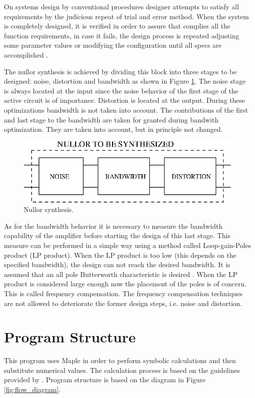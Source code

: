 \documentclass[conference]{IEEEtran}
\begin{document}
On systems design by conventional procedures designer attempts to satisfy all requirements by the judicious repeat of trial and error method. When the system is completely designed, it is verified in order to assure that complies all the function requirements, in case it fails, the design process is repeated adjusting some parameter values or modifying the configuration until all specs are accomplished \cite{ogata}.

The nullor synthesis is achieved by dividing this block into three stages to be designed:  noise, distortion and bandwidth as shown in Figure \ref{fig:block}. The noise stage is always located at the input since the noise behavior of the first stage of the active circuit is of importance. Distortion is located at the output. During these optimizations bandwidth is not taken into account. The contributions of the first and last stage to the bandwidth are taken for granted during bandwith optimization. They are taken into account, but in principle not changed.

\begin{figure}[hbtp]
	\centering
	\includegraphics[scale=.7]{figures/blocks.eps}
	\caption{Nullor synthesis.}
	\label{fig:block}
\end{figure}

As for the bandwidth behavior it is necessary to measure the bandwidth capability of the amplifier before starting the design of this last stage. This measure can be performed in a simple way using a method called Loop-gain-Poles product (LP product). When the LP product is too low (this depends on the specified bandwidth), the design can not reach the desired bandwidth. It is assumed that an all pole Butterworth characteristic is desired \cite{chen}. When the LP product is considered large enough now the placement of the poles is of concern. This is called frequency compensation. The frequency compensation techniques are not allowed to deteriorate the former design steps, i.e. noise and distortion.

\section{Program Structure}
This program uses Maple in order to perform symbolic calculations and then substitute numerical values. The calculation process is based on the guidelines provided by \cite{wseas}. Program structure is based on the diagram in Figure \ref{fig:flow_diagram}.
\end{document}
